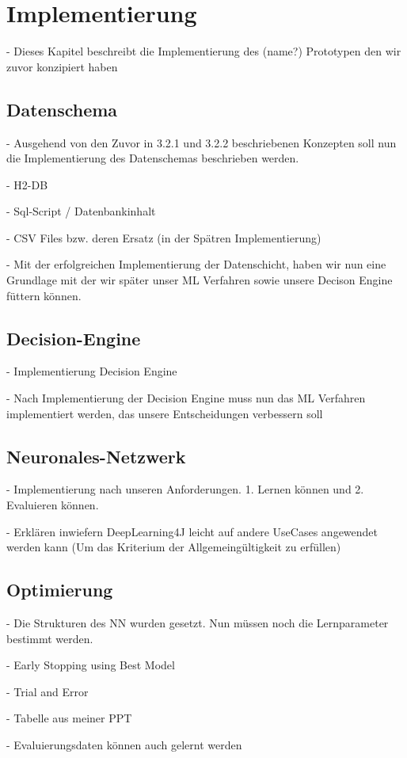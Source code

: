 \chapter{Implementierung}
\label{ch:implementierung4}
- Dieses Kapitel beschreibt die Implementierung des (name?) Prototypen den wir zuvor konzipiert haben

\section{Datenschema}
- Ausgehend von den Zuvor in 3.2.1 und 3.2.2 beschriebenen Konzepten soll nun die Implementierung des Datenschemas beschrieben werden.

- H2-DB

- Sql-Script / Datenbankinhalt

- CSV Files bzw. deren Ersatz (in der Spätren Implementierung)

- Mit der erfolgreichen Implementierung der Datenschicht, haben wir nun eine Grundlage mit der wir später unser ML Verfahren sowie unsere Decison Engine füttern können.

\section{Decision-Engine}
- Implementierung Decision Engine 

- Nach Implementierung der Decision Engine muss nun das ML Verfahren implementiert werden, das unsere Entscheidungen verbessern soll

\section{Neuronales-Netzwerk}
- Implementierung nach unseren Anforderungen. 1. Lernen können und 2. Evaluieren können.  

- Erklären inwiefern DeepLearning4J leicht auf andere UseCases angewendet werden kann (Um das Kriterium der Allgemeingültigkeit zu erfüllen)

\section{Optimierung}
- Die Strukturen des NN wurden gesetzt. Nun müssen noch die Lernparameter bestimmt werden.

- Early Stopping using Best Model 

- Trial and Error

- Tabelle aus meiner PPT

- Evaluierungsdaten können auch gelernt werden 